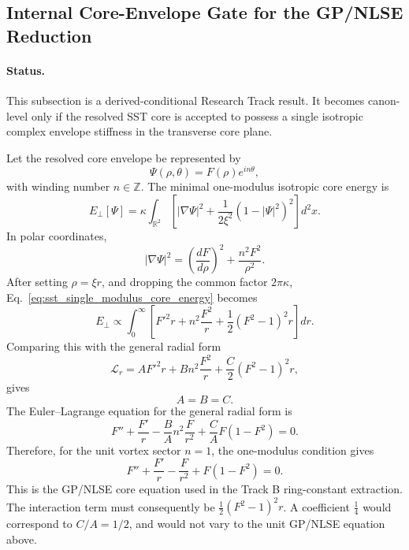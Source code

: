 \subsection{Internal Core-Envelope Gate for the GP/NLSE Reduction}
\label{subsec:internal_abc_core_envelope_gate}

\paragraph{Status.}
This subsection is a derived-conditional Research Track result.  It becomes
canon-level only if the resolved SST core is accepted to possess a single
isotropic complex envelope stiffness in the transverse core plane.

Let the resolved core envelope be represented by
\begin{equation}
\Psi(\rho,\theta)=F(\rho)e^{in\theta},
\end{equation}
with winding number \(n\in\mathbb Z\).  The minimal one-modulus isotropic core
energy is
\begin{equation}
E_\perp[\Psi]
=
\kappa\int_{\mathbb R^2}
\left[
|\nabla\Psi|^2
+
\frac{1}{2\xi^2}(1-|\Psi|^2)^2
\right]d^2x .
\label{eq:sst_single_modulus_core_energy}
\end{equation}
In polar coordinates,
\begin{equation}
|\nabla\Psi|^2
=
\left(\frac{dF}{d\rho}\right)^2
+
\frac{n^2F^2}{\rho^2}.
\end{equation}
After setting \(\rho=\xi r\), and dropping the common factor \(2\pi\kappa\),
Eq.~\eqref{eq:sst_single_modulus_core_energy} becomes
\begin{equation}
E_\perp
\propto
\int_0^\infty
\left[
F'^2 r+n^2\frac{F^2}{r}
+\frac12(F^2-1)^2r
\right]dr .
\label{eq:sst_dimensionless_gp_core_energy}
\end{equation}
Comparing this with the general radial form
\begin{equation}
\mathcal L_r
=A F'^2 r+B n^2\frac{F^2}{r}
+\frac{C}{2}(F^2-1)^2r,
\end{equation}
gives
\begin{equation}
\boxed{A=B=C.}
\end{equation}
The Euler--Lagrange equation for the general radial form is
\begin{equation}
F''+\frac{F'}{r}
-\frac{B}{A}n^2\frac{F}{r^2}
+\frac{C}{A}F(1-F^2)=0 .
\end{equation}
Therefore, for the unit vortex sector \(n=1\), the one-modulus condition gives
\begin{equation}
\boxed{
F''+\frac{F'}{r}-\frac{F}{r^2}+F(1-F^2)=0 .
}
\end{equation}
This is the GP/NLSE core equation used in the Track B ring-constant extraction.
The interaction term must consequently be \(\frac12(F^2-1)^2r\).  A coefficient
\(\frac14\) would correspond to \(C/A=1/2\), and would not vary to the unit
GP/NLSE equation above.

